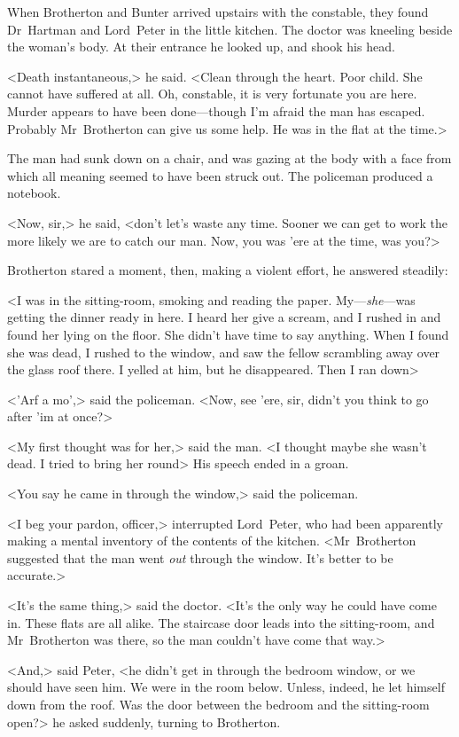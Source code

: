 When Brotherton and Bunter arrived upstairs with the constable, they found Dr~Hartman and Lord~Peter in the little kitchen. The doctor was kneeling beside the woman's body. At their entrance he looked up, and shook his head.

<Death instantaneous,> he said. <Clean through the heart. Poor child. She cannot have suffered at all. Oh, constable, it is very fortunate you are here. Murder appears to have been done—though I'm afraid the man has escaped. Probably Mr~Brotherton can give us some help. He was in the flat at the time.>

The man had sunk down on a chair, and was gazing at the body with a face from which all meaning seemed to have been struck out. The policeman produced a notebook.

<Now, sir,> he said, <don't let's waste any time. Sooner we can get to work the more likely we are to catch our man. Now, you was 'ere at the time, was you?>

Brotherton stared a moment, then, making a violent effort, he answered steadily:

<I was in the sitting-room, smoking and reading the paper. My—\emph{she}—was getting the dinner ready in here. I heard her give a scream, and I rushed in and found her lying on the floor. She didn't have time to say anything. When I found she was dead, I rushed to the window, and saw the fellow scrambling away over the glass roof there. I yelled at him, but he disappeared. Then I ran down\longdash>

<'Arf a mo',> said the policeman. <Now, see 'ere, sir, didn't you think to go after 'im at once?>

<My first thought was for her,> said the man. <I thought maybe she wasn't dead. I tried to bring her round\longdash> His speech ended in a groan.

<You say he came in through the window,> said the policeman.

<I beg your pardon, officer,> interrupted Lord~Peter, who had been apparently making a mental inventory of the contents of the kitchen. <Mr~Brotherton suggested that the man went \emph{out} through the window. It's better to be accurate.>

<It's the same thing,> said the doctor. <It's the only way he could have come in. These flats are all alike. The staircase door leads into the sitting-room, and Mr~Brotherton was there, so the man couldn't have come that way.>

<And,> said Peter, <he didn't get in through the bedroom window, or we should have seen him. We were in the room below. Unless, indeed, he let himself down from the roof. Was the door between the bedroom and the sitting-room open?> he asked suddenly, turning to Brotherton.

